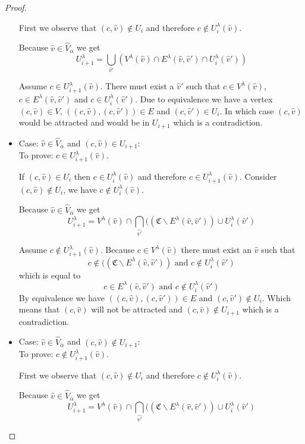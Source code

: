 \begin{lemma}
\begin{proof}
\begin{itemize}
			
			First we observe that $(c,\hat{v}) \notin U_i$ and therefore $c \notin U^\lambda_i(\hat{v})$.
			
			Because $\hat{v} \in \hat{V}_{\alpha}$ we get
			\[ U^\lambda_{i+1} =\bigcup_{\hat{v}'} (V^\lambda(\hat{v}) \cap E^\lambda(\hat{v},\hat{v}') \cap U^\lambda_i(\hat{v}')) \]
			
			Assume $c \in U^\lambda_{i+1}(\hat{v})$. There must exist a $\hat{v}'$ such that $c \in V^\lambda(\hat{v})$, $c \in E^\lambda(\hat{v},\hat{v}')$ and $c \in U^\lambda_i(\hat{v}')$. Due to equivalence we have a vertex $(c,\hat{v}) \in V$, $((c,\hat{v}),(c,\hat{v}')) \in E$ and $(c,\hat{v}') \in U_i$. In which case $(c,\hat{v})$ would be attracted and would be in $U_{i+1}$ which is a contradiction.
			\item Case: $\hat{v} \in \hat{V}_{\overline{\alpha}}$ and $(c,\hat{v}) \in U_{i+1}$:\\
			To prove: $c \in U^\lambda_{i+1}(\hat{v})$.
			
			If $(c,\hat{v}) \in U_i$ then $c \in U^\lambda_i(\hat{v})$ and therefore $c \in U^\lambda_{i+1}(\hat{v})$. Consider $(c,\hat{v}) \notin U_i$, we have $c \notin U^\lambda_i(\hat{v})$.
			
			Because $\hat{v} \in \hat{V}_{\overline{\alpha}}$ we get
			\[ U^\lambda_{i+1} =V^\lambda(\hat{v}) \cap \bigcap_{\hat{v'}}((\mathfrak{C} \backslash E^\lambda(\hat{v},\hat{v}')) \cup U^\lambda_i(\hat{v}') \]
			
			Assume $c \notin U^\lambda_{i+1}(\hat{v})$. Because $c \in V^\lambda(\hat{v})$ there must exist an $\hat{v}$ such that
			\[ c \notin ((\mathfrak{C} \backslash E^\lambda(\hat{v},\hat{v}')) \text{ and } c \notin U^\lambda_i(\hat{v}') \]
			which is equal to
			\[ c \in E^\lambda(\hat{v},\hat{v}') \text{ and } c \notin U^\lambda_i(\hat{v}') \]
			By equivalence we have $((c,\hat{v}),(c,\hat{v}')) \in E$ and $(c,\hat{v}') \notin U_i$. Which means that $(c,\hat{v})$ will not be attracted and $(c,\hat{v}) \notin U_{i+1}$ which is a contradiction.
			\item Case: $\hat{v} \in \hat{V}_{\overline{\alpha}}$ and $(c,\hat{v}) \notin U_{i+1}$:\\
			To prove: $c \notin U^\lambda_{i+1}(\hat{v})$.
			
			First we observe that $(c,\hat{v}) \notin U_i$ and therefore $c \notin U^\lambda_i(\hat{v})$.
			
			Because $\hat{v} \in \hat{V}_{\overline{\alpha}}$ we get
			\[ U^\lambda_{i+1} =V^\lambda(\hat{v}) \cap \bigcap_{\hat{v'}}((\mathfrak{C} \backslash E^\lambda(\hat{v},\hat{v}')) \cup U^\lambda_i(\hat{v}') \]
			

\end{itemize}
\end{proof}
\end{lemma}
